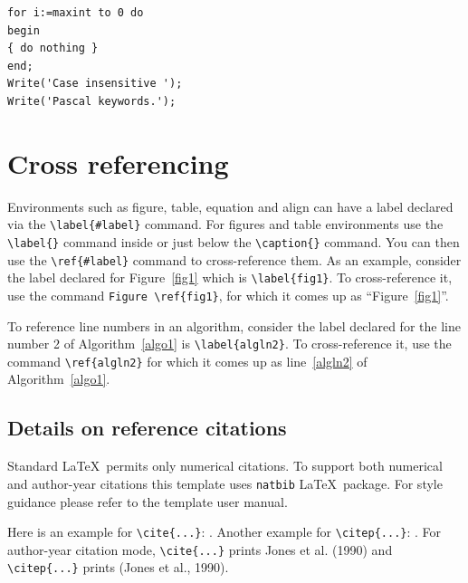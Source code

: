 \documentclass{article}
\begin{document}
\bigskip
\begin{minipage}{\hsize}%
\lstset{frame=single,framexleftmargin=-1pt,framexrightmargin=-17pt,framesep=12pt,linewidth=0.98\textwidth,language=pascal}%
\begin{lstlisting}
for i:=maxint to 0 do
begin
{ do nothing }
end;
Write('Case insensitive ');
Write('Pascal keywords.');
\end{lstlisting}
\end{minipage}

\section{Cross referencing}\label{sec8}

Environments such as figure, table, equation and align can have a label
declared via the \verb+\label{#label}+ command. For figures and table
environments use the \verb+\label{}+ command inside or just
below the \verb+\caption{}+ command. You can then use the
\verb+\ref{#label}+ command to cross-reference them. As an example, consider
the label declared for Figure~\ref{fig1} which is
\verb+\label{fig1}+. To cross-reference it, use the command 
\verb+Figure \ref{fig1}+, for which it comes up as
``Figure~\ref{fig1}''. 

To reference line numbers in an algorithm, consider the label declared for the line number 2 of Algorithm~\ref{algo1} is \verb+\label{algln2}+. To cross-reference it, use the command \verb+\ref{algln2}+ for which it comes up as line~\ref{algln2} of Algorithm~\ref{algo1}.

\subsection{Details on reference citations}\label{subsec7}

Standard \LaTeX\ permits only numerical citations. To support both numerical and author-year citations this template uses \verb+natbib+ \LaTeX\ package. For style guidance please refer to the template user manual.

Here is an example for \verb+\cite{...}+: \cite{bib1}. Another example for \verb+\citep{...}+: \citep{bib2}. For author-year citation mode, \verb+\cite{...}+ prints Jones et al. (1990) and \verb+\citep{...}+ prints (Jones et al., 1990).
\end{document}
